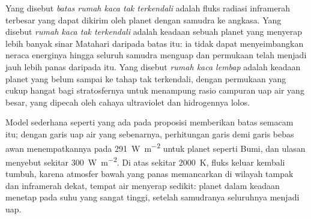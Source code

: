 \begin{definition}\label{def:b3:planetary-atmospheres:runaway}
Yang disebut \emph{batas rumah kaca tak terkendali} adalah
fluks radiasi inframerah terbesar yang dapat dikirim oleh planet dengan samudra ke
angkasa. Yang disebut \emph{rumah kaca tak terkendali} adalah keadaan
sebuah planet yang menyerap lebih banyak sinar Matahari daripada batas itu: ia tidak dapat menyeimbangkan
neraca energinya hingga seluruh samudra menguap dan permukaan
telah menjadi jauh lebih panas daripada itu. Yang disebut \emph{rumah kaca lembap}
adalah keadaan planet yang belum sampai ke tahap tak terkendali, dengan permukaan yang cukup
hangat bagi stratosfernya untuk menampung rasio campuran uap air yang besar,
yang dipecah oleh cahaya ultraviolet dan hidrogennya lolos.
\end{definition}

Model sederhana seperti yang ada pada proposisi memberikan batas semacam itu; dengan
garis uap air yang sebenarnya, perhitungan garis demi garis bebas awan
menempatkannya pada \qty{291}{W.m^{-2}} untuk planet seperti Bumi, dan
ulasan menyebut sekitar \qty{300}{W.m^{-2}}. Di atas sekitar \qty{2000}{K}, fluks keluar
kembali tumbuh, karena atmosfer bawah yang panas memancarkan di
wilayah tampak dan inframerah dekat, tempat air menyerap sedikit: planet dalam
keadaan  menetap pada suhu yang sangat tinggi, setelah samudranya
seluruhnya menjadi uap.

